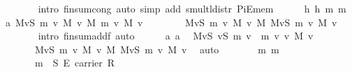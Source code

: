 \begin{isabellebody}
\ \ \ \ \ \ \isamarkupfalse%
\ {\isacharparenleft}intro\ finsum{\isacharunderscore}cong{\isacharprime}{\isacharcomma}\ auto\ simp\ add{\isacharcolon}\ smult{\isacharunderscore}l{\isacharunderscore}distr\ PiE{\isacharunderscore}mem{}{\isacharparenright}\isanewline
\ \ \ \ \isamarkupfalse%
\ h\ h{}\ m{}\ m{}\ \isamarkupfalse%
\ a{}{\isacharcolon}\ {\isachardoublequoteopen}{\isacharparenleft}{\isasymOplus}\isactrlbsub M\isactrlesub v{\isasymin}S{\isachardot}\ m{}\ v\ {\isasymodot}\isactrlbsub M\isactrlesub \ v\ {\isasymoplus}\isactrlbsub M\isactrlesub \ m{}\ v\ {\isasymodot}\isactrlbsub M\isactrlesub \ v{\isacharparenright}\ {\isacharequal}\ \isanewline
\ \ \ \ \ \ {\isacharparenleft}{\isasymOplus}\isactrlbsub M\isactrlesub v{\isasymin}S{\isachardot}\ m{}\ v\ {\isasymodot}\isactrlbsub M\isactrlesub \ v{\isacharparenright}\ {\isasymoplus}\isactrlbsub M\isactrlesub \ {\isacharparenleft}{\isasymOplus}\isactrlbsub M\isactrlesub v{\isasymin}S{\isachardot}\ m{}\ v\ {\isasymodot}\isactrlbsub M\isactrlesub \ v{\isacharparenright}{\isachardoublequoteclose}\isanewline
\ \ \ \ \ \ \isamarkupfalse%
\ {\isacharparenleft}intro\ finsum{\isacharunderscore}addf{\isacharcomma}\ auto{\isacharparenright}\isanewline
\ \ \ \ \isamarkupfalse%
\ a{}\ a{}\ \isamarkupfalse%
\ {\isachardoublequoteopen}{\isacharparenleft}{\isasymOplus}\isactrlbsub M\isactrlesub v{\isasymin}S{\isachardot}\ {\isacharparenleft}{\isasymlambda}v{\isasymin}S{\isachardot}\ m{}\ v\ {\isasymoplus}\ m{}\ v{\isacharparenright}\ v\ {\isasymodot}\isactrlbsub M\isactrlesub \ v{\isacharparenright}\ {\isacharequal}\isanewline
\ \ \ \ \ \ \ {\isacharparenleft}{\isasymOplus}\isactrlbsub M\isactrlesub v{\isasymin}S{\isachardot}\ m{}\ v\ {\isasymodot}\isactrlbsub M\isactrlesub \ v{\isacharparenright}\ {\isasymoplus}\isactrlbsub M\isactrlesub \ {\isacharparenleft}{\isasymOplus}\isactrlbsub M\isactrlesub v{\isasymin}S{\isachardot}\ m{}\ v\ {\isasymodot}\isactrlbsub M\isactrlesub \ v{\isacharparenright}{\isachardoublequoteclose}\ \isamarkupfalse%
\ auto\isanewline
\ \ \isacommand{{\isacharbraceright}}\isamarkupfalse%
\isanewline
\ \ \isamarkupfalse%
\ {}{\isacharcolon}\ {\isachardoublequoteopen}{\isasymAnd}m{}\ m{}{\isachardot}\isanewline
\ \ \ \ \ \ \ m{}\ {\isasymin}\ S\ {\isasymrightarrow}\isactrlsub E\ carrier\ R\ {\isasymLongrightarrow}\isanewline

\end{isabellebody}
